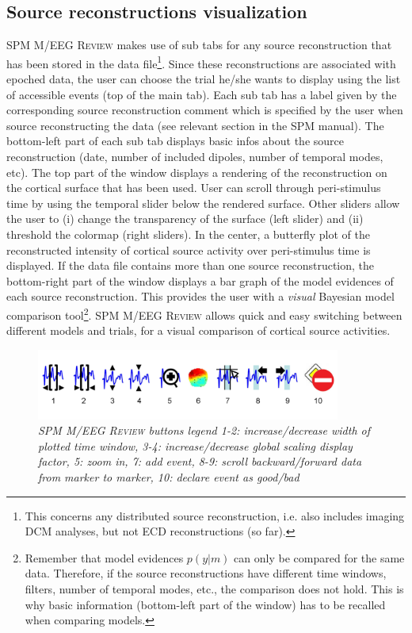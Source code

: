 \subsection{Source reconstructions visualization}
SPM M/EEG \textsc{Review} makes use of sub tabs for any source reconstruction that has been stored in the data file\footnote{This concerns any distributed source reconstruction, i.e. also includes imaging DCM analyses, but not ECD reconstructions (so far).}. Since these reconstructions are associated with epoched data, the user can choose the trial he/she wants to display using the list of accessible events (top of the main tab). Each sub tab has a label given by the corresponding source reconstruction comment which is specified by the user when source reconstructing the data (see relevant section in the SPM manual). The bottom-left part of each sub tab displays basic infos about the source reconstruction (date, number of included dipoles, number of temporal modes, etc). The top part of the window displays a rendering of the reconstruction on the cortical surface that has been used. User can scroll through peri-stimulus time by using the temporal slider below the rendered surface. Other sliders allow the user to (i) change the transparency of the surface (left slider) and (ii) threshold the colormap (right sliders). In the center, a butterfly plot of the reconstructed intensity of cortical source activity over peri-stimulus time is displayed. If the data file contains more than one source reconstruction, the bottom-right part of the window displays a bar graph of the model evidences of each source reconstruction. This provides the user with a \emph{visual} Bayesian model comparison tool\footnote{Remember that model evidences $p(y|m)$ can only be compared for the same data. Therefore, if the source reconstructions have different time windows, filters, number of temporal modes, etc., the comparison does not hold. This is why basic information (bottom-left part of the window) has to be recalled when comparing models.}. SPM M/EEG \textsc{Review} allows quick and easy switching between different models and trials, for a visual comparison of cortical source activities.

\begin{figure}
\begin{center}
\includegraphics[width=100mm]{meeg/eeg_review_buttons}
\end{center}
\caption{\em SPM M/EEG \textsc{Review} buttons legend 1-2: increase/decrease width of plotted time window, 3-4: increase/decrease global scaling display factor, 5: zoom in, 7: add event, 8-9: scroll backward/forward data from marker to marker, 10: declare event as good/bad}
\end{figure}


